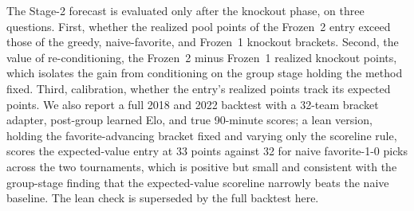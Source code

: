 The Stage-2 forecast is evaluated only after the knockout phase, on three
questions. First, whether the realized pool points of the Frozen~2 entry exceed
those of the greedy, naive-favorite, and Frozen~1 knockout brackets. Second, the
value of re-conditioning, the Frozen~2 minus Frozen~1 realized knockout points,
which isolates the gain from conditioning on the group stage holding the method
fixed. Third, calibration, whether the entry's realized points track its expected
points. We also report a full 2018 and 2022 backtest with a 32-team bracket
adapter, post-group learned Elo, and true 90-minute scores; a lean version,
holding the favorite-advancing bracket fixed and varying only the scoreline rule,
scores the expected-value entry at 33 points against 32 for naive favorite-1-0
picks across the two tournaments, which is positive but small and consistent with
the group-stage finding that the expected-value scoreline narrowly beats the
naive baseline. The lean check is superseded by the full backtest here.



